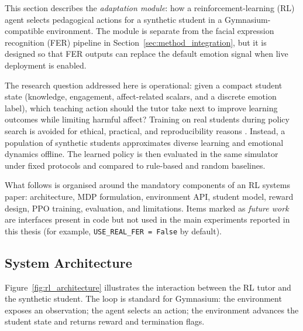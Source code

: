 This section describes the \emph{adaptation module}: how a reinforcement-learning (RL) agent selects pedagogical actions for a synthetic student in a Gymnasium-compatible environment. The module is separate from the facial expression recognition (FER) pipeline in Section~\ref{sec:method_integration}, but it is designed so that FER outputs can replace the default emotion signal when live deployment is enabled.

The research question addressed here is operational: given a compact student state (knowledge, engagement, affect-related scalars, and a discrete emotion label), which teaching action should the tutor take next to improve learning outcomes while limiting harmful affect? Training on real students during policy search is avoided for ethical, practical, and reproducibility reasons \cite{azoulay_adaptive_2021,perez_emotions_2024,fernandez-herrero_evaluating_2024}. Instead, a population of synthetic students approximates diverse learning and emotional dynamics offline. The learned policy is then evaluated in the same simulator under fixed protocols and compared to rule-based and random baselines.

What follows is organised around the mandatory components of an RL systems paper: architecture, MDP formulation, environment API, student model, reward design, PPO training, evaluation, and limitations. Items marked as \emph{future work} are interfaces present in code but not used in the main experiments reported in this thesis (for example, \texttt{USE\_REAL\_FER = False} by default).

\subsection{System Architecture}\label{sec:method_rl_architecture}

Figure~\ref{fig:rl_architecture} illustrates the interaction between the RL tutor and the synthetic student. The loop is standard for Gymnasium: the environment exposes an observation; the agent selects an action; the environment advances the student state and returns reward and termination flags.

